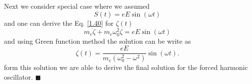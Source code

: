 \documentclass[a4paper]{article}
\numberwithin{equation}{subsection}
\numberwithin{equation}{section}
\begin{document}
\noindent
Next we consider special case where we assumed
\begin{equation} \label{1.49}
  S(t) = eE\sin(\omega t)
\end{equation}
and one can derive the Eq. \eqref{1.40} for $\zeta(t)$
\begin{equation} \label{1.50}
  m_e\ddot{\zeta} + m_e\omega_0^2\zeta = eE\sin(\omega t)
\end{equation}
and using Green function method the solution can be write as
\begin{equation} \label{1.51}
  \zeta(t) = \frac{eE}{m_e(\omega_0^2 - \omega^2)}\sin(\omega t).
\end{equation}
form this solution we are able to derive the final solution for the forced harmonic oscillator. \hfill$\blacksquare$
\end{document}

